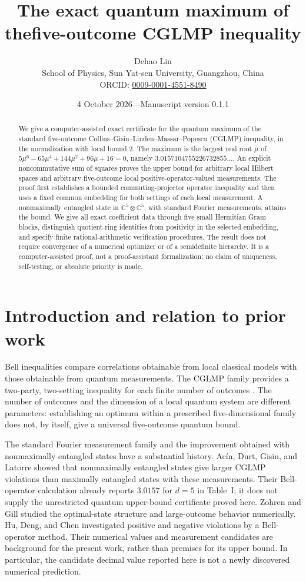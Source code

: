 \documentclass[11pt,a4paper]{article}
\title{The exact quantum maximum of the\newline five-outcome CGLMP inequality}
\author{Dehao Lin\\[3pt]
  \small School of Physics, Sun Yat-sen University, Guangzhou, China\\
  \small ORCID: \href{https://orcid.org/0009-0001-4551-8490}{0009-0001-4551-8490}}
\date{4 October 2026\quad---\quad Manuscript version 0.1.1}
\numberwithin{equation}{section}
\theoremstyle{remark}\newtheorem{remark}[theorem]{Remark}
\newcommand{\C}{\mathbb C}
\begin{document}
\maketitle
\begin{abstract}
We give a computer-assisted exact certificate for the quantum maximum of the
\mbox{standard} five-outcome Collins--Gisin--Linden--Massar--Popescu (CGLMP) inequality,
in the normalization with local bound $2$. The maximum is the largest real root
$\mu$ of $5\mu^6-65\mu^4+144\mu^2+96\mu+16=0$, namely
$3.0157104755226732855\ldots$. An explicit noncommutative sum of squares proves
the upper bound for arbitrary local Hilbert spaces and arbitrary five-outcome
local positive-operator-valued measurements. The proof first establishes a
bounded commuting-projector operator inequality and then uses a fixed common
embedding for both settings of each local measurement. A nonmaximally entangled
state in $\C^5\otimes\C^5$, with standard Fourier measurements, attains the
bound. We give all exact coefficient data through five small Hermitian Gram
blocks, distinguish quotient-ring identities from positivity in the selected
embedding, and specify finite rational-arithmetic verification procedures.
The result does not require convergence of a numerical optimizer or of a
semidefinite hierarchy. It is a computer-assisted proof, not a proof-assistant
formalization; no claim of uniqueness, self-testing, or absolute priority is made.
\end{abstract}

\section{Introduction and relation to prior work}
Bell inequalities compare correlations obtainable from local classical models
with those obtainable from quantum measurements. The CGLMP family provides a
two-party, two-setting inequality for each finite number of outcomes
\cite{CGLMP}. The number of outcomes and the dimension of a local quantum system
are different parameters: establishing an optimum within a prescribed
five-dimensional family does not, by itself, give a universal five-outcome
quantum bound.

The standard Fourier measurement family and the improvement obtained with
nonmaximally entangled states have a substantial history. Ac\'in, Durt,
Gisin, and Latorre \cite{AcinDurtGisinLatorre} showed that nonmaximally
entangled states give larger CGLMP violations than maximally entangled
states with these measurements. Their Bell-operator calculation already
reports $3.0157$ for $d=5$ in Table~I; it does not supply the unrestricted
quantum upper-bound certificate proved here. Zohren and Gill
\cite{ZohrenGill} studied the optimal-state structure and large-outcome
behavior numerically. Hu, Deng, and Chen \cite{HuDengChen} investigated positive
and negative violations by a Bell-operator method. Their numerical values and
measurement candidates are background for the present work, rather than
premises for its upper bound. In particular, the candidate decimal value
reported here is not a newly discovered numerical prediction.
\end{document}

